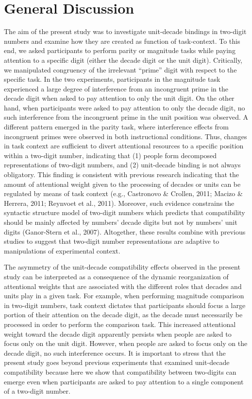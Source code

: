 \documentclass[english,man]{apa6}
\theoremstyle{definition}
\theoremstyle{definition}
\theoremstyle{definition}
\theoremstyle{remark}
\begin{document}
\section{General Discussion}\label{general-discussion}

The aim of the present study was to investigate unit-decade bindings in
two-digit numbers and examine how they are created as function of
task-context. To this end, we asked participants to perform parity or
magnitude tasks while paying attention to a specific digit (either the
decade digit or the unit digit). Critically, we manipulated congruency
of the irrelevant \enquote{prime} digit with respect to the specific
task. In the two experiments, participants in the magnitude task
experienced a large degree of interference from an incongruent prime in
the decade digit when asked to pay attention to only the unit digit. On
the other hand, when participants were asked to pay attention to only
the decade digit, no such interference from the incongruent prime in the
unit position was observed. A different pattern emerged in the parity
task, where interference effects from incongruent primes were observed
in both instructional conditions. Thus, changes in task context are
sufficient to divert attentional resources to a specific position within
a two-digit number, indicating that (1) people form decomposed
representations of two-digit numbers, and (2) unit-decade binding is not
always obligatory. This finding is consistent with previous research
indicating that the amount of attentional weight given to the processing
of decades or units can be regulated by means of task context (e.g.,
Castronovo \& Crollen, 2011; Macizo \& Herrera, 2011; Reynvoet et al.,
2011). Moreover, such evidence constrains the syntactic structure model
of two-digit numbers which predicts that compatibility should be mainly
affected by numbers' decade digits but not by numbers' unit digits
(Ganor-Stern et al., 2007). Altogether, these results combine with
previous studies to suggest that two-digit number representations are
adaptive to manipulations of experimental context.

The asymmetry of the unit-decade compatibility effects observed in the
present study can be interpreted as a consequence of the dynamic
reorganization of attentional weights that are associated with the
different roles that decades and units play in a given task. For
example, when performing magnitude comparison in two-digit numbers, task
context dictates that participants should focus a large portion of their
attention on the decade digit, as the decade must necessarily be
processed in order to perform the comparison task. This increased
attentional weight toward the decade digit apparently persists when
people are asked to focus only on the unit digit. However, when people
are asked to focus only on the decade digit, no such interference
occurs. It is important to stress that the present study goes beyond
previous experiments that examined unit-decade compatibility because
here we show that compatibility between two-digits can emerge even when
participants are asked to pay attention to a single component of a
two-digit number.
\end{document}
